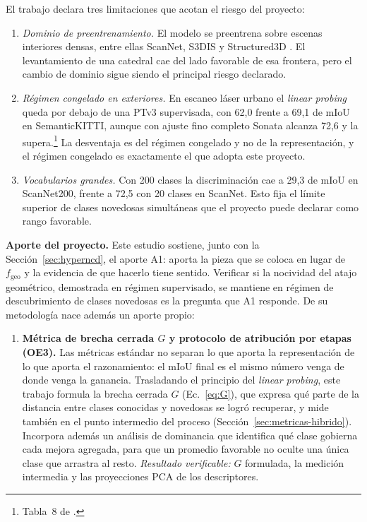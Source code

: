 El trabajo declara tres limitaciones que acotan el riesgo del proyecto:

\begin{enumerate}
\item \textit{Dominio de preentrenamiento.} El modelo se preentrena sobre escenas
interiores densas, entre ellas ScanNet, S3DIS y Structured3D
\cite{wu2025sonata}. El levantamiento de una catedral cae del lado favorable de
esa frontera, pero el cambio de dominio sigue siendo el principal riesgo
declarado.

\item \textit{Régimen congelado en exteriores.} En escaneo láser urbano el
\emph{linear probing} queda por debajo de una PTv3 supervisada, con 62,0 frente a
69,1 de mIoU en SemanticKITTI, aunque con ajuste fino completo Sonata alcanza
72,6 y la supera.\footnote{Tabla~8 de \cite{wu2025sonata}.} La desventaja es del
régimen congelado y no de la representación, y el régimen congelado es
exactamente el que adopta este proyecto.

\item \textit{Vocabularios grandes.} Con 200 clases la discriminación cae a 29,3
de mIoU en ScanNet200, frente a 72,5 con 20 clases en ScanNet. Esto fija el
límite superior de clases novedosas simultáneas que el proyecto puede declarar
como rango favorable.
\end{enumerate}

\textbf{Aporte del proyecto.} Este estudio sostiene, junto con la
Sección~\ref{sec:hyperncd}, el aporte A1: aporta la pieza que se coloca en
lugar de $f_{\text{geo}}$ y la evidencia de que hacerlo tiene sentido. Verificar
si la nocividad del atajo geométrico, demostrada en régimen supervisado, se
mantiene en régimen de descubrimiento de clases novedosas es la pregunta que A1
responde. De su metodología nace además un aporte propio:

\begin{enumerate}
\item[\textbf{A3}] \textbf{Métrica de brecha cerrada $G$ y protocolo de
atribución por etapas (OE3).} Las métricas estándar no separan lo que aporta la
representación de lo que aporta el razonamiento: el mIoU final es el mismo número
venga de donde venga la ganancia. Trasladando el principio del \emph{linear
probing}, este trabajo formula la brecha cerrada $G$ (Ec.~\eqref{eq:G}), que
expresa qué parte de la distancia entre clases conocidas y novedosas se logró
recuperar, y mide también en el punto intermedio del proceso
(Sección~\ref{sec:metricas-hibrido}). Incorpora además un análisis de dominancia
que identifica qué clase gobierna cada mejora agregada, para que un promedio
favorable no oculte una única clase que arrastra al resto. \emph{Resultado
verificable:} $G$ formulada, la medición intermedia y las proyecciones PCA de los
descriptores.
\end{enumerate}

